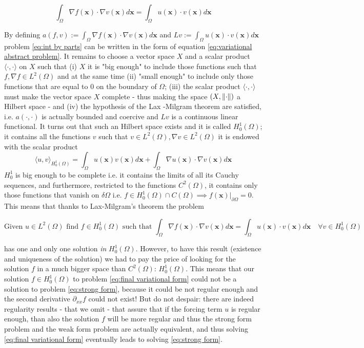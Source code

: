 \begin{equation}\label{eq:int by parts}
	\int_\Omega \nabla f(\mathbf x)\cdot\nabla v(\mathbf x) d\mathbf x = \int_\Omega  u(\mathbf x)\cdot v(\mathbf x)d\mathbf x
\end{equation}

By defining $a(f, v):=	\int_\Omega \nabla f(\mathbf x)\cdot\nabla v(\mathbf x) d\mathbf x $ and $Lv := \int_\Omega  u(\mathbf x)\cdot v(\mathbf x)d\mathbf x$ problem \ref{eq:int by parts} can be written in the form of equation \ref{eq:variational abstract problem}. It remains to choose a vector space $X$ and a scalar product $\langle\cdot,\cdot\rangle$ on $X$ such that (i) $X$ it is "big enough" to include those functions such that $f, \nabla f \in L^2(\Omega)$ and at the same time (ii) "small enough" to include only those functions that are equal to 0 on the boundary of $\Omega$; (iii) the scalar product $\langle\cdot, \cdot\rangle$ must make the vector space $X$ complete - thus making the space $(X, \left\lVert\cdot\right\rVert)$ a Hilbert space - and (iv) the hypothesis of the Lax -Milgram theorem are satisfied, i.e. $a(\cdot, \cdot)$ is actually bounded and coercive and $Lv$ is a continuous linear functional. It turns out that such an Hilbert space exists and it is called $H^1_0(\Omega)$; it contains all the functions $v$ such that $v\in L^2(\Omega), \nabla v\in L^2(\Omega)$ it is endowed with the scalar product 
$$
\langle u, v\rangle_{H^1_0(\Omega)} = \int_\Omega u(\mathbf x)v(\mathbf x)d\mathbf x + \int_\Omega\nabla u(\mathbf x)\cdot \nabla v(\mathbf x) d\mathbf x
$$
$H^1_0$ is big enough to be complete i.e. it contains the limits of all its Cauchy sequences, and furthermore, restricted to the functions $C^2(\Omega)$, it contains only those functions that vanish on $\delta \Omega$ i.e. $f\in H^1_0(\Omega)\cap C(\Omega) \implies \left.f(\mathbf x)\right|_{\partial\Omega}=0$. This means that thanks to Lax-Milgram's theorem the problem

\begin{equation}\label{eq:final variational form}
	\text{Given }u\in L^2(\Omega)\text{ find }f\in H^1_0(\Omega)\text{ such that }\int_\Omega \nabla f(\mathbf x)\cdot\nabla v(\mathbf x) d\mathbf x = \int_\Omega  u(\mathbf x)\cdot v(\mathbf x)d\mathbf x\quad \forall v\in H^1_0(\Omega)
\end{equation}

has one and only one solution \textit{in} $H^1_0(\Omega)$. However, to have this result (existence and uniqueness of the solution) we had to pay the price of looking for the solution $f$ in a much bigger space than $C^2(\Omega)$: $H^1_0(\Omega)$. This means that our solution $f\in H^1_0(\Omega)$ to problem \ref{eq:final variational form} could not be a solution to problem \ref{eq:strong form}, because it could be not regular enough and the second derivative $\partial_{xx}f$ could not exist! But do not despair: there are indeed regularity results - that we omit - that assure that if the forcing term $u$ is regular enough, than also the solution $f$ will be more regular and thus the strong form problem and the weak form problem are actually equivalent, and thus solving \ref{eq:final variational form} eventually leads to solving \ref{eq:strong form}.

